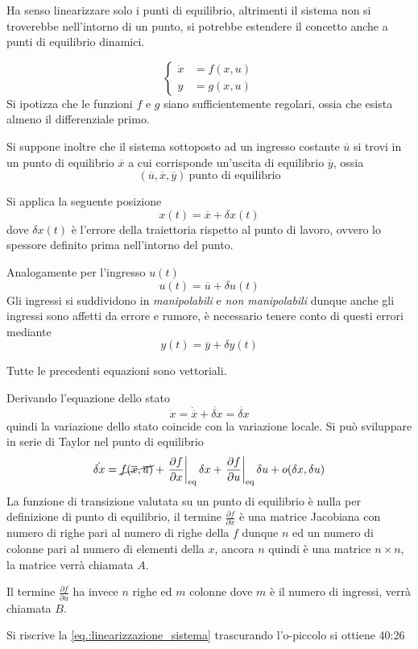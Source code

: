 Ha senso linearizzare solo i punti di equilibrio, altrimenti il sistema non si
troverebbe nell'intorno di un punto, si potrebbe estendere il concetto anche a
punti di equilibrio dinamici.

$$\left\{
\begin{aligned}
\dot{x} &= f(x,u) \\
y &= g(x,u)
\end{aligned}\right.$$
Si ipotizza che le funzioni $f$ e $g$ siano sufficientemente regolari, ossia
che esista almeno il differenziale primo.

Si suppone inoltre che il sistema sottoposto ad un ingresso costante
$\overline{u}$ si trovi in un punto di equilibrio $\overline{x}$ a cui
corrisponde un'uscita di equilibrio $\overline{y}$, ossia
$$
(\overline{u},\overline{x},\overline{y}) \ \text{punto di equilibrio}
$$

Si applica la seguente posizione
$$
x(t) = \overline{x} + \delta x(t)
$$
dove $\delta x(t)$ è l'errore della traiettoria rispetto al punto di lavoro,
ovvero lo spessore definito prima nell'intorno del punto.

Analogamente per l'ingresso $u(t)$
$$
u(t) = \overline{u} + \delta u(t)
$$
Gli ingressi si suddividono in \textit{manipolabili} e \textit{non
manipolabili} dunque
anche gli ingressi sono affetti da errore e rumore,  è necessario tenere conto
di questi errori mediante
$$
y(t) = \overline{y}+\delta y(t)
$$

Tutte le precedenti equazioni sono vettoriali.

Derivando l'equazione dello stato
$$
\dot{x} = \dot{\overline{x}} + \dot{\delta x} = \dot{\delta x}
$$
quindi la variazione dello stato coincide con la variazione locale. Si può
sviluppare in serie di Taylor nel punto di equilibrio
\begin{equation}
\dot{\delta x} = \cancel{f(\overline{x},\overline{u})} + \left.\frac{\partial
f}{\partial x}\right|_{\text{eq}}\delta x + \left.\frac{\partial f}{\partial
u}\right|_{\text{eq}}\delta u + o(\delta x, \delta u)
\label{eq.:linearizzazione_sistema}
\end{equation}
La funzione di transizione valutata su un punto di equilibrio è nulla per
definizione di punto di equilibrio, il termine $\frac{\partial f}{\partial x}$
è una matrice Jacobiana con numero di righe pari al numero di righe della $f$
dunque $n$ ed un numero di colonne pari al numero di elementi della $x$, ancora
$n$ quindi è una matrice $n\times n$, la matrice verrà chiamata $A$.

Il termine $\frac{\partial f}{\partial u}$ ha invece $n$ righe ed $m$ colonne
dove $m$ è il numero di ingressi, verrà chiamata $B$.

Si riscrive la \ref{eq.:linearizzazione_sistema} trascurando l'o-piccolo si
ottiene 40:26

